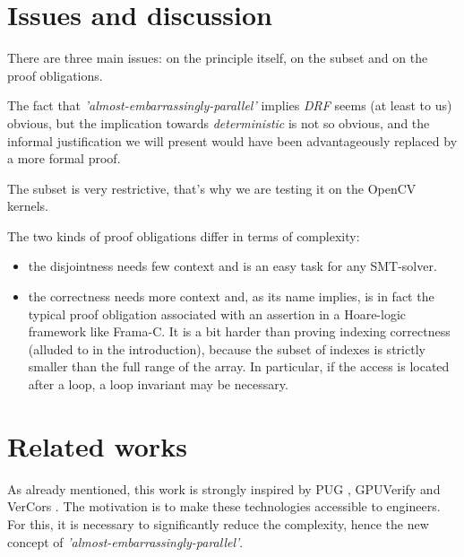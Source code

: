 \documentclass[a4paper,10pt]{article} %
\begin{document}
\section{Issues and discussion}

There are three main issues: on the principle itself, on the subset and on the proof obligations.

The fact that \emph{'almost-embarrassingly-parallel'} implies \emph{DRF} seems (at least to us) obvious, but the implication towards \emph{deterministic} is not so obvious,
and the informal justification we will present would have been advantageously replaced by a more formal proof. 

The subset is very restrictive, that's why we are testing it on the OpenCV kernels.

The two kinds of proof obligations differ in terms of complexity:
\begin{itemize}
\item the disjointness needs few context and is an easy task for any SMT-solver.
\item the correctness needs more context and, as its name implies, is in fact the typical proof obligation associated with an assertion in a Hoare-logic framework like Frama-C.
It is a bit harder than proving indexing correctness (alluded to in the introduction), because the subset of indexes is strictly smaller than the full range of the array.
In particular, if the access is located after a loop, a loop invariant may be necessary.
\end{itemize}

\begin{comment}

bla

skeletons : \cite{cole2004bringing}, \cite{steuwer2011skelc}

\cite{betts2012gpuverify}

Early GPUs were primarily tailored toward \emph{embarrassingly parallel} graphics workloads :
computing independently each of the pixels that constitute the display, hence a low degree of data sharing.

\end{comment}

\section{Related works}

As already mentioned, this work is strongly inspired by PUG \cite{li2010scalable}, GPUVerify \cite{betts2012gpuverify} and VerCors \cite{blom2014vercors}.
The motivation is to make these technologies accessible to engineers.
For this, it is necessary to significantly reduce the complexity, hence the new concept of \emph{'almost-embarrassingly-parallel'}.
\end{document}
